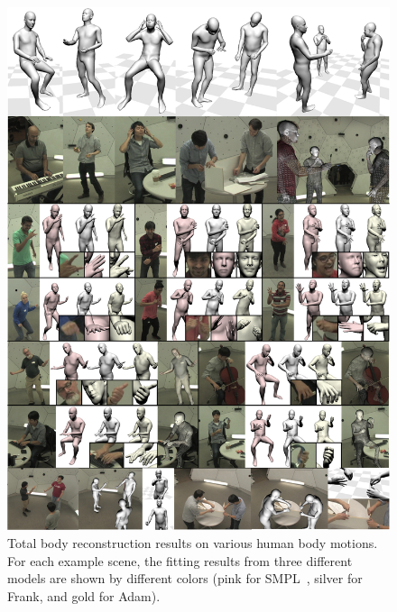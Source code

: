 
\begin{figure}[t]
	\includegraphics[width=\textwidth]{tbc_figures/Qualitative_thesis.jpg}
	\caption{Total body reconstruction results on various human body motions. For each example scene, the fitting results from three different models are shown by different colors (pink for SMPL~\cite{Loper2015}, silver for Frank, and gold for Adam). 
	}
	\label{fig:qualitativeResults}
\end{figure}
%

